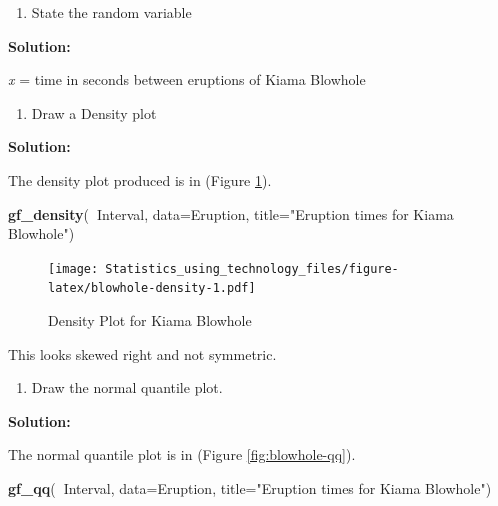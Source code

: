 \documentclass[
]{book}
\newenvironment{Shaded}{\begin{snugshade}}{\end{snugshade}}
\newcommand{\DataTypeTok}[1]{\textcolor[rgb]{0.13,0.29,0.53}{#1}}
\newcommand{\KeywordTok}[1]{\textcolor[rgb]{0.13,0.29,0.53}{\textbf{#1}}}
\newcommand{\NormalTok}[1]{#1}
\newcommand{\OperatorTok}[1]{\textcolor[rgb]{0.81,0.36,0.00}{\textbf{#1}}}
\newcommand{\StringTok}[1]{\textcolor[rgb]{0.31,0.60,0.02}{#1}}
\providecommand{\tightlist}{%
  \setlength{\itemsep}{0pt}\setlength{\parskip}{0pt}}
\begin{document}
\begin{enumerate}
\def\labelenumi{\alph{enumi}.}
\tightlist
\item
  State the random variable
\end{enumerate}

\textbf{Solution:}

\emph{x} = time in seconds between eruptions of Kiama Blowhole

\begin{enumerate}
\def\labelenumi{\alph{enumi}.}
\setcounter{enumi}{1}
\tightlist
\item
  Draw a Density plot
\end{enumerate}

\textbf{Solution:}

The density plot produced is in (Figure \ref{fig:blowhole-density}).



\begin{Shaded}
\begin{Highlighting}[]
\KeywordTok{gf_density}\NormalTok{(}\OperatorTok{~}\NormalTok{Interval, }\DataTypeTok{data=}\NormalTok{Eruption, }\DataTypeTok{title=}\StringTok{"Eruption times for Kiama Blowhole"}\NormalTok{)}
\end{Highlighting}
\end{Shaded}

\begin{figure}
\centering
\texttt{[image: Statistics\_using\_technology\_files/figure-latex/blowhole-density-1.pdf]}
\caption{\label{fig:blowhole-density}Density Plot for Kiama Blowhole}
\end{figure}

This looks skewed right and not symmetric.

\begin{enumerate}
\def\labelenumi{\alph{enumi}.}
\setcounter{enumi}{2}
\tightlist
\item
  Draw the normal quantile plot.
\end{enumerate}

\textbf{Solution:}

The normal quantile plot is in (Figure \ref{fig:blowhole-qq}).



\begin{Shaded}
\begin{Highlighting}[]
\KeywordTok{gf_qq}\NormalTok{(}\OperatorTok{~}\NormalTok{Interval, }\DataTypeTok{data=}\NormalTok{Eruption, }\DataTypeTok{title=}\StringTok{"Eruption times for Kiama Blowhole"}\NormalTok{)}
\end{Highlighting}
\end{Shaded}
\end{document}
